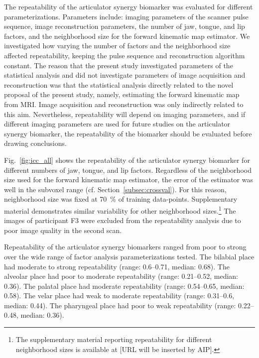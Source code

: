 \documentclass[preprint]{JASAnew}\usepackage[]{graphicx}\usepackage[]{color}
\begin{document}
The repeatability of the articulator synergy biomarker was evaluated for different parameterizations. 
%
Parameters include: imaging parameters of the scanner pulse sequence, image reconstruction parameters, the number of jaw, tongue, and lip factors, and the neighborhood size for the forward kinematic map estimator.
%
We investigated how varying the number of factors and the neighborhood size affected repeatability, keeping the pulse sequence and reconstruction algorithm constant. 
%
The reason that the present study investigated parameters of the statistical analysis and did not investigate parameters of image acquisition and reconstruction was that the statistical analysis directly related to the novel proposal of the present study, namely, estimating the forward kinematic map from MRI. Image acquisition and reconstruction was only indirectly related to this aim. 
%
Nevertheless, repeatability will depend on imaging parameters, and if different imaging parameters are used for future studies on the articulator synergy biomarker, the repeatability of the biomarker should be evaluated before drawing conclusions. 

Fig.~\ref{fig:icc_all} shows the repeatability of the articulator synergy biomarker for different numbers of jaw, tongue, and lip factors. 
%
Regardless of the neighborhood size used for the forward kinematic map estimator, the error of the estimator was well in the subvoxel range (cf. Section~\ref{subsec:crossval}). For this reason, neighborhood size was fixed at \SI{70}{\percent} of training data-points. Supplementary material demonstrates similar variability for other neighborhood sizes.\footnote{The supplementary material reporting repeatability for different neighborhood sizes is available at [URL will be inserted by AIP].}
%
The images of participant F3 were excluded from the repeatability analysis due to poor image quality in the second scan. 



Repeatability of the articulator synergy biomarkers ranged from poor to strong over the wide range of factor analysis parameterizations tested. 
%
%
The bilabial place had
moderate  to  strong
repeatability
(range: \numrange{0.6}{0.71},
median: \num{0.68}). 
%
% 
The alveolar place had
poor  to  moderate
repeatability
(range: \numrange{0.21}{0.52},
median: \num{0.36}). 
%
%
The palatal place had
moderate
repeatability
(range: \numrange{0.54}{0.65},
median: \num{0.58}). 
%
%
The velar place had
weak  to  moderate
repeatability
(range: \numrange{0.31}{0.6},
median: \num{0.44}). 
%
%
The pharyngeal place had 
poor  to  weak
repeatability
(range: \numrange{0.22}{0.48},
median: \num{0.36}). 
\end{document}
